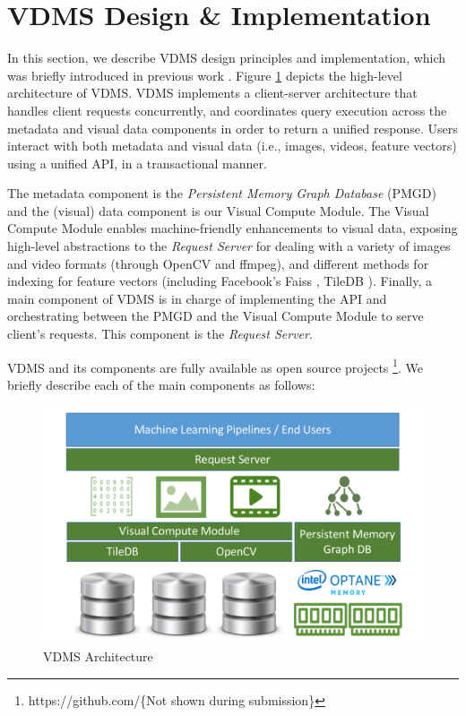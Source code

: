 \section{VDMS Design \& Implementation}
\label{arch}

In this section, we describe VDMS design principles and implementation, 
which was briefly introduced in previous work \cite{vdms-nips}.
Figure \ref{fig:arch} depicts the high-level architecture of VDMS.
VDMS implements a client-server architecture that handles client
requests concurrently, and coordinates query execution across
the metadata and visual data components in order to return a unified response.
Users interact with both metadata and visual data 
(i.e., images, videos, feature vectors) using a unified API, 
in a transactional manner.

The metadata component is the \textit{Persistent Memory Graph
Database} (PMGD) and the (visual) data component is our Visual Compute Module.
The Visual Compute Module enables machine-friendly enhancements to
visual data, exposing high-level abstractions to the \textit{Request Server}
for dealing with a variety of images and video formats (through OpenCV and ffmpeg),
and different methods for indexing for feature vectors
(including Facebook's Faiss \cite{faiss}, TileDB \cite{TileDB}).
Finally, a main component of VDMS is in charge of implementing the API and orchestrating between the PMGD and the Visual Compute Module
to serve client's requests. This component is the \textit{Request Server}. 

VDMS and its components are fully available as open source projects
\footnote{https://github.com/\{Not shown during submission\}}.
We briefly describe each of the main components as follows:

\begin{figure}
\centering
\includegraphics[width=1\columnwidth]{figures/vdms_arch.pdf}
\caption{VDMS Architecture}
\label{fig:arch}
\end{figure}


